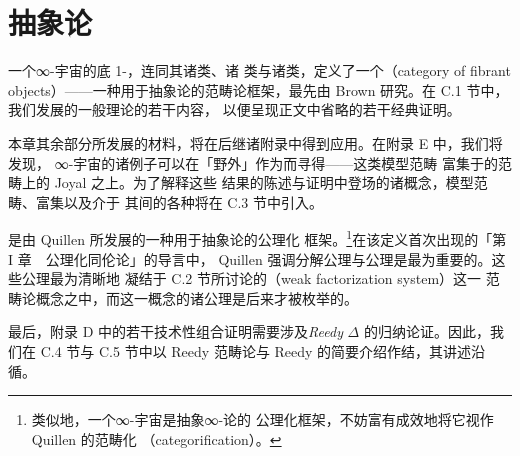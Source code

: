 \chapter{抽象\trHomotopy{}论}\label{ch:abstract-homotopy-theory}


一个∞-宇宙的底 1-\trCategory{}，连同其诸\trIsofibration{}类、诸\trEquivalence{}%
类与诸\trTrivialFibration{}类，定义了一个\emph{\trCategoryOfFibrantObjects}（category of
fibrant objects）——一种用于抽象\trHomotopy{}论的范畴论框架，最先由 Brown
研究\cite{bib23}。在 C.1 节中，我们发展\trCategoryOfFibrantObjects{}的一般理论的若干内容，
以便呈现正文中省略的若干经典证明。

本章其余部分所发展的材料，将在后继诸附录中得到应用。在附录 E 中，我们将发现，
∞-宇宙的诸例子可以在「野外」作为\emph{\trModelCategory}而寻得——这类模型范畴
富集于\trSimplicialSet{}的范畴上的 Joyal \trModelStructure{}之上。为了解释这些
结果的陈述与证明中登场的诸概念，模型范畴、富集\trModelCategory{}以及介于
其间的各种\trFunctor{}将在 C.3 节中引入。

\trModelCategory{}是由 Quillen 所发展的一种用于抽象\trHomotopy{}论的公理化
框架\cite{bib93}。\footnote{类似地，一个∞-宇宙是抽象∞-\trCategory{}论的
公理化框架，不妨富有成效地将它视作 Quillen \trModelCategory{}的范畴化
（categorification）。}在该定义首次出现的「第 I 章　公理化同伦论」的导言中，
Quillen 强调分解公理与\trLifting{}公理是最为重要的。这些公理最为清晰地
凝结于 C.2 节所讨论的\emph{\trWeakFactorizationSystem}（weak factorization system）这一
范畴论概念之中，而这一概念的诸公理是后来才被枚举的。

最后，附录 D 中的若干技术性组合证明需要涉及\emph{Reedy \trCategory}
$\Delta$ 的归纳论证。因此，我们在 C.4 节与 C.5 节中以 Reedy 范畴论与
Reedy \trModelStructure{}的简要介绍作结，其讲述沿循\cite{bib107}。

